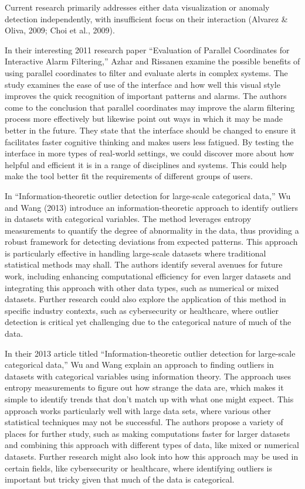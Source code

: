 \documentclass[print]{nuthesis}
\begin{document}
Current research primarily addresses either data visualization or anomaly detection independently, with insufficient focus on their interaction (Alvarez \& Oliva, 2009; Choi et al., 2009).

In their interesting 2011 research paper ``Evaluation of Parallel Coordinates for Interactive Alarm Filtering,'' Azhar and Rissanen examine the possible benefits of using parallel coordinates to filter and evaluate alerts in complex systems.
The study examines the ease of use of the interface and how well this visual style improves the quick recognition of important patterns and alarms.
The authors come to the conclusion that parallel coordinates may improve the alarm filtering process more effectively but likewise point out ways in which it may be made better in the future.
They state that the interface should be changed to ensure it facilitates faster cognitive thinking and makes users less fatigued.
By testing the interface in more types of real-world settings, we could discover more about how helpful and efficient it is in a range of disciplines and systems.
This could help make the tool better fit the requirements of different groups of users.

In ``Information-theoretic outlier detection for large-scale categorical data,'' Wu and Wang (2013) introduce an information-theoretic approach to identify outliers in datasets with categorical variables.
The method leverages entropy measurements to quantify the degree of abnormality in the data, thus providing a robust framework for detecting deviations from expected patterns.
This approach is particularly effective in handling large-scale datasets where traditional statistical methods may shall.
The authors identify several avenues for future work, including enhancing computational efficiency for even larger datasets and integrating this approach with other data types, such as numerical or mixed datasets.
Further research could also explore the application of this method in specific industry contexts, such as cybersecurity or healthcare, where outlier detection is critical yet challenging due to the categorical nature of much of the data.

In their 2013 article titled ``Information-theoretic outlier detection for large-scale categorical data,'' Wu and Wang explain an approach to finding outliers in datasets with categorical variables using information theory.
The approach uses entropy measurements to figure out how strange the data are, which makes it simple to identify trends that don't match up with what one might expect.
This approach works particularly well with large data sets, where various other statistical techniques may not be successful.
The authors propose a variety of places for further study, such as making computations faster for larger datasets and combining this approach with different types of data, like mixed or numerical datasets.
Further research might also look into how this approach may be used in certain fields, like cybersecurity or healthcare, where identifying outliers is important but tricky given that much of the data is categorical.
\end{document}
